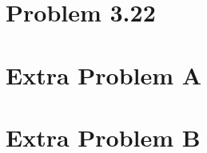 \documentclass[11pt,a4paper,oneside]{report}
\begin{document}
\section*{Problem 3.22}


\section*{Extra Problem A}


\section*{Extra Problem B}
\end{document}
